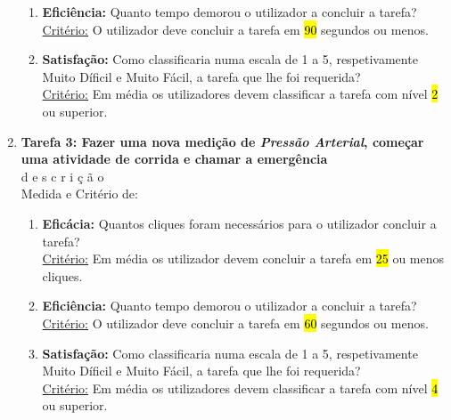 \documentclass[12pt]{article}
\begin{document}
\begin{enumerate}
\begin{enumerate}
            \item \textbf{Eficiência:} Quanto tempo demorou o utilizador a concluir a tarefa?\\
            \underline{Critério:} O utilizador deve concluir a tarefa em \hl{90} segundos ou menos.
            
            \item \textbf{Satisfação:} Como classificaria numa escala de 1 a 5, respetivamente Muito Díficil e Muito Fácil, a tarefa que lhe foi requerida?\\
            \underline{Critério:} Em média os utilizadores devem classificar a tarefa com nível \hl{2} ou superior.
        \end{enumerate}
        
        \item \textbf{Tarefa 3: Fazer uma nova medição de \emph{Pressão Arterial}, começar uma atividade de corrida e chamar a emergência}\\
        d e s c r i ç ã o\\
        Medida e Critério de:
        \begin{enumerate}
            \item \textbf{Eficácia:} Quantos cliques foram necessários para o utilizador concluir a tarefa?\\
            \underline{Critério:} Em média os utilizador devem concluir a tarefa em \hl{25} ou menos cliques.
            
            \item \textbf{Eficiência:} Quanto tempo demorou o utilizador a concluir a tarefa?\\
            \underline{Critério:} O utilizador deve concluir a tarefa em \hl{60} segundos ou menos.
            
            \item \textbf{Satisfação:} Como classificaria numa escala de 1 a 5, respetivamente Muito Díficil e Muito Fácil, a tarefa que lhe foi requerida?\\
            \underline{Critério:} Em média os utilizadores devem classificar a tarefa com nível \hl{4} ou superior.
        \end{enumerate}
    \end{enumerate}
\end{document}
